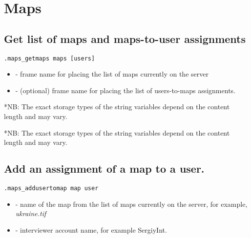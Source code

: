 \section{Maps}


\subsection{Get list of maps and maps-to-user assignments}
\begin{lstlisting}[style=CommandLineStyle]
.maps_getmaps maps [users]
\end{lstlisting}

\paramsheader
\begin{itemize}
  \item {} - frame name for placing the list of maps currently on the server
  \item {} - (optional) frame name for placing the list of users-to-maps assignments.
\end{itemize}

\begin{compactitem}
\end{compactitem}
*NB: The exact storage types of the string variables depend on the content
     length and may vary.

\begin{compactitem}
\end{compactitem}
*NB: The exact storage types of the string variables depend on the content
     length and may vary.


\subsection{Add an assignment of a map to a user.}
\begin{lstlisting}[style=CommandLineStyle]
.maps_addusertomap map user
\end{lstlisting}

\paramsheader
\begin{itemize}
  \item {} - name of the map from the list of maps
        currently on the server, for example, \textquotedbl
        \textit{ukraine.tif}\textquotedbl
  \item {} - interviewer account name, for example
        \textquotedbl SergiyInt\textquotedbl.
\end{itemize}


